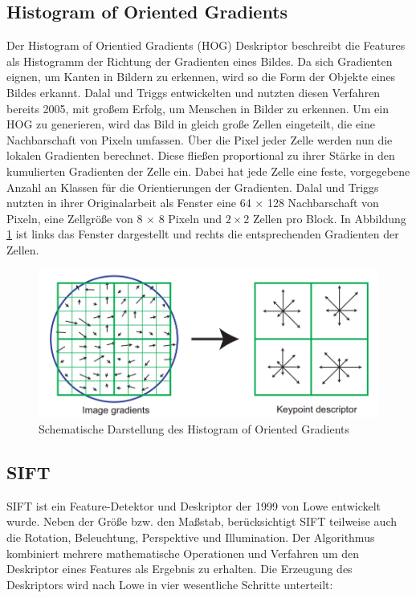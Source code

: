\subsection{Histogram of Oriented Gradients}

Der Histogram of Orientied Gradients (HOG) Deskriptor beschreibt die Features als Histogramm der Richtung der Gradienten eines Bildes. Da sich Gradienten eignen, um Kanten in Bildern zu erkennen, wird so die Form der Objekte eines Bildes erkannt. Dalal und Triggs \cite{hog2005} entwickelten und nutzten diesen Verfahren bereits 2005, mit großem Erfolg, um Menschen in Bilder zu erkennen. 
Um ein HOG zu generieren, wird das Bild in gleich große Zellen eingeteilt, die eine Nachbarschaft von Pixeln umfassen. Über die Pixel jeder Zelle werden nun die lokalen Gradienten berechnet. Diese fließen proportional zu ihrer Stärke in den kumulierten Gradienten der Zelle ein. Dabei hat jede Zelle eine feste, vorgegebene Anzahl an Klassen für die Orientierungen der Gradienten. 
Dalal und Triggs nutzten in ihrer Originalarbeit als Fenster eine 64 $\times$ 128 Nachbarschaft von Pixeln, eine Zellgröße von 8 $\times$ 8 Pixeln und $2 \times 2$ Zellen pro Block. In Abbildung \ref{img:hog} ist links das Fenster dargestellt und rechts die entsprechenden Gradienten der Zellen. 

\begin{figure}
	\centering
	\includegraphics[scale=0.5]{images/hog.png}
	\caption{Schematische Darstellung des Histogram of Oriented Gradients  \cite{dif2004}}
	\label{img:hog}
\end{figure}

\subsection{SIFT}

SIFT ist ein Feature-Detektor und Deskriptor der 1999 von Lowe \cite{dif2004} entwickelt wurde. Neben der Größe bzw. den Maßstab, berücksichtigt SIFT teilweise auch die Rotation, Beleuchtung, Perspektive und Illumination. Der Algorithmus kombiniert mehrere mathematische Operationen und Verfahren um den Deskriptor eines Features als Ergebnis zu erhalten. Die Erzeugung des Deskriptors wird nach Lowe in vier wesentliche Schritte unterteilt:

